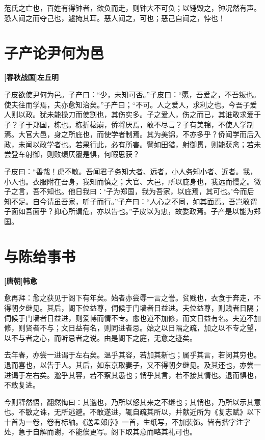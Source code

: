 \documentclass[UTF8,titlepage,oneside]{ctexbook}
\begin{document}
范氏之亡也，百姓有得钟者，欲负而走，则钟大不可负；以锤毁之，钟况然有声。恐人闻之而夺己也，遽掩其耳。恶人闻之，可也；恶己自闻之，悖也！

\chapter*{子产论尹何为邑}
\begin{center}
	\textbf{[春秋战国]左丘明}
\end{center}


子皮欲使尹何为邑。子产曰：“少，未知可否。”子皮曰：“愿，吾爱之，不吾叛也。使夫往而学焉，夫亦愈知治矣。”子产曰；“不可。人之爱人，求利之也。今吾子爱人则以政。犹未能操刀而使割也，其伤实多。子之爱人，伤之而已，其谁敢求爱于子？子于郑国，栋也。栋折榱崩，侨将厌焉，敢不尽言？子有美锦，不使人学制焉。大官大邑，身之所庇也，而使学者制焉。其为美锦，不亦多乎？侨闻学而后入政，未闻以政学者也。若果行此，必有所害。譬如田猎，射御贯，则能获禽；若未尝登车射御，则败绩厌覆是惧，何暇思获？


子皮曰：“善哉！虎不敏。吾闻君子务知大者、远者，小人务知小者、近者。我，小人也。衣服附在吾身，我知而慎之；大官、大邑，所以庇身也，我远而慢之。微子之言，吾不知也。他日我曰：‘子为郑国，我为吾家，以庇焉，其可也。’今而后知不足。自今请虽吾家，听子而行。”子产曰：“人心之不同，如其面焉。吾岂敢谓子面如吾面乎？抑心所谓危，亦以告也。”子皮以为忠，故委政焉。子产是以能为郑国。



\chapter*{与陈给事书}
\begin{center}
	\textbf{[唐朝]韩愈}
\end{center}

愈再拜：愈之获见于阁下有年矣。始者亦尝辱一言之誉。贫贱也，衣食于奔走，不得朝夕继见。其后，阁下位益尊，伺候于门墙者日益进。夫位益尊，则贱者日隔；伺候于门墙者日益进，则爱博而情不专。愈也道不加修，而文日益有名。夫道不加修，则贤者不与；文日益有名，则同进者忌。始之以日隔之疏，加之以不专之望，以不与者之心，而听忌者之说。由是阁下之庭，无愈之迹矣。

去年春，亦尝一进谒于左右矣。温乎其容，若加其新也；属乎其言，若闵其穷也。退而喜也，以告于人。其后，如东京取妻子，又不得朝夕继见。及其还也，亦尝一进谒于左右矣。邈乎其容，若不察其愚也；悄乎其言，若不接其情也。退而惧也，不敢复进。

今则释然悟，翻然悔曰：其邈也，乃所以怒其来之不继也；其悄也，乃所以示其意也。不敏之诛，无所逃避。不敢遂进，辄自疏其所以，并献近所为《复志赋》以下十首为一卷，卷有标轴。《送孟郊序》一首，生纸写，不加装饰。皆有揩字注字处，急于自解而谢，不能俟更写。阁下取其意而略其礼可也。
\end{document}
